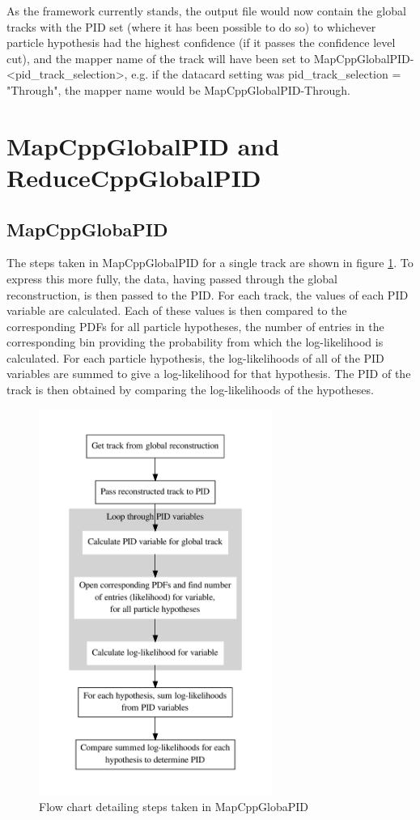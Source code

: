 As the framework currently stands, the output file would now contain the global tracks with the PID set (where it has been possible to do so) to whichever particle hypothesis had the highest confidence (if it passes the confidence level cut), and the mapper name of the track will have been set to MapCppGlobalPID-<pid\_track\_selection>, e.g. if the datacard setting was pid\_track\_selection = "Through", the mapper name would be MapCppGlobalPID-Through.

\section{MapCppGlobalPID and ReduceCppGlobalPID}
\label{mapred}
\subsection{MapCppGlobaPID}
\label{map}
The steps taken in MapCppGlobalPID for a single track are shown in 
figure \ref{mapflow}. To express this more fully, the data, having passed through the global reconstruction, is then passed to the PID. For each track, the values of each PID variable are calculated. Each of these values is then compared to the corresponding PDFs for all particle hypotheses, the number of entries in the corresponding bin providing the probability from which the log-likelihood is calculated. For each particle hypothesis, the log-likelihoods of all of the PID variables are summed to give a log-likelihood for that hypothesis. The PID of the track is then obtained by comparing the log-likelihoods of the hypotheses.
\begin{figure}[h!]
\begin{center} 
\includegraphics[width=3in]{reconstruction/globalpid/PIDflow.pdf} 
\caption{Flow chart detailing steps taken in MapCppGlobaPID}
\label{mapflow}
\end{center} 
\end{figure}

